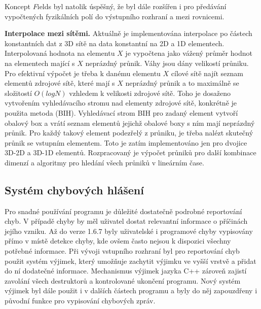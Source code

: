 \documentclass[11pt]{report}
\begin{document}
Koncept {\emph Fields} byl natolik úspěšný, že byl dále rozšířen i pro 
předávání vypočtených fyzikálních polí do výstupního rozhraní a mezi 
rovnicemi.

{\bf Interpolace mezi sítěmi.}
Aktuálně je implementována interpolace po částech konstantních dat z 3D sítě na 
data konstantní na 2D a 1D elementech. Interpolovaná hodnota na elementu $X$ je 
vypočtena jako vážený průměr hodnot na elementech mající s $X$ neprázdný 
průnik. Váhy jsou dány velikostí průniku.
Pro efektivní výpočet je třeba k danému 
elementu $X$ cílové sítě najít seznam elementů zdrojové sítě, které mají s $X$ 
neprázdný průnik a to maximálně se složitostí $O(log N)$ vzhledem k velikosti 
zdrojové sítě. Toho je dosaženo vytvořením vyhledávacího stromu nad elementy 
zdrojové sítě, konkrétně je použita metoda 
(BIH). 
Vyhledávací strom BIH pro zadaný element vytvoří obalový box a vrátí seznam 
elementů jejichž obalové boxy s ním mají neprázdný průnik. Pro každý takový 
element podezřelý z průniku, je třeba nalézt skutečný průnik se vstupním 
elementem. Toto je zatím implementováno jen pro dvojice 3D-2D a 3D-1D elementů. 
Rozpracovaný je výpočet průniků pro další kombinace dimenzí a algoritmy 
pro hledání všech průniků v lineárním čase.

\subsection{Systém chybových hlášení}
Pro snadné používání programu je důležité dostatečně podrobné 
reportování chyb. V případě chyby by měl uživatel dostat relevantní 
informace o příčinách jejího vzniku. 
Až do verze 1.6.7 byly uživatelské i programové chyby vypisovány přímo v místě 
detekce chyby, kde ovšem často nejsou k dispozici všechny potřebné informace. 
Při vývoji vstupního rozhraní byl pro reportování chyb použit systém výjimek, 
který umožňuje zachytit výjimku ve vyšší vrstvě a přidat do ní dodatečné 
informace. Mechanismus výjimek jazyka C++ zároveň zajistí zavolání všech 
destruktorů a kontrolované ukončení programu.
Nový systém výjimek byl dále použit i v dalších částech 
programu a byly do něj zapouzdřeny i původní funkce pro vypisování chybových 
zpráv. 
\end{document}
